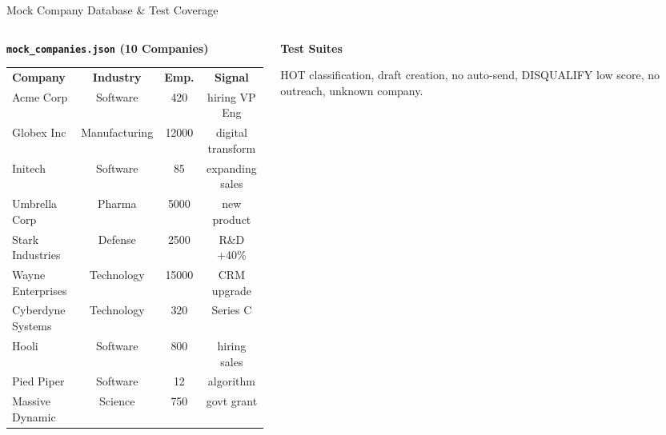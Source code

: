 \documentclass[aspectratio=169,10pt]{beamer}
\begin{document}
\begin{frame}{Mock Company Database \& Test Coverage}
\begin{columns}[T]
\begin{column}{0.52\textwidth}
  {\small\bfseries \faDatabase\; \texttt{mock\_companies.json} (10 Companies)}
  \vspace{3pt}
  \centering\scriptsize
  \begin{tabular}{@{}lccc@{}}
    \toprule
    \rowcolor{darkblue}\color{white}\textbf{Company} & \color{white}\textbf{Industry} & \color{white}\textbf{Emp.} & \color{white}\textbf{Signal} \\
    \rowcolor{rowA} Acme Corp        & Software    & 420   & hiring VP Eng \\
    \rowcolor{rowB} Globex Inc       & Manufacturing & 12000 & digital transform \\
    \rowcolor{rowA} Initech          & Software    & 85    & expanding sales \\
    \rowcolor{rowB} Umbrella Corp    & Pharma      & 5000  & new product \\
    \rowcolor{rowA} Stark Industries & Defense     & 2500  & R\&D +40\% \\
    \rowcolor{rowB} Wayne Enterprises& Technology  & 15000 & CRM upgrade \\
    \rowcolor{rowA} Cyberdyne Systems& Technology  & 320   & Series C \\
    \rowcolor{rowB} Hooli            & Software    & 800   & hiring sales \\
    \rowcolor{rowA} Pied Piper       & Software    & 12    & algorithm \\
    \rowcolor{rowB} Massive Dynamic  & Science     & 750   & govt grant \\
    \bottomrule
  \end{tabular}
\end{column}
\begin{column}{0.46\textwidth}
  {\small\bfseries \faFlask\; Test Suites}
  \vspace{3pt}
  \begin{tcolorbox}[colback=accentgreen!3,colframe=accentgreen!50,arc=3mm,fonttitle=\scriptsize\bfseries,
    title={\texttt{test\_scoring.py} — 6 tests}]
    \scriptsize
    HOT classification, draft creation, no auto-send, DISQUALIFY low score, no outreach, unknown company.
  \end{tcolorbox}

\end{column}
\end{columns}
\end{frame}
\end{document}
